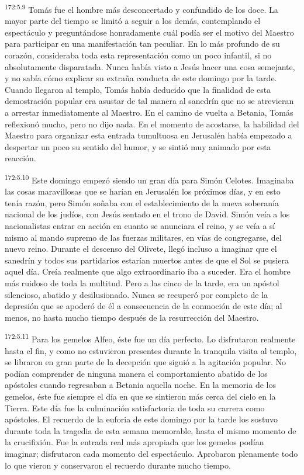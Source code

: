 \par
\textsuperscript{172:5.9} Tomás fue el hombre más desconcertado y confundido de los doce. La mayor parte del tiempo se limitó a seguir a los demás, contemplando el espectáculo y preguntándose honradamente cuál podía ser el motivo del Maestro para participar en una manifestación tan peculiar. En lo más profundo de su corazón, consideraba toda esta representación como un poco infantil, si no absolutamente disparatada. Nunca había visto a Jesús hacer una cosa semejante, y no sabía cómo explicar su extraña conducta de este domingo por la tarde. Cuando llegaron al templo, Tomás había deducido que la finalidad de esta demostración popular era asustar de tal manera al sanedrín que no se atrevieran a arrestar inmediatamente al Maestro. En el camino de vuelta a Betania, Tomás reflexionó mucho, pero no dijo nada. En el momento de acostarse, la habilidad del Maestro para organizar esta entrada tumultuosa en Jerusalén había empezado a despertar un poco su sentido del humor, y se sintió muy animado por esta reacción.

\par
\textsuperscript{172:5.10} Este domingo empezó siendo un gran día para Simón Celotes. Imaginaba las cosas maravillosas que se harían en Jerusalén los próximos días, y en esto tenía razón, pero Simón soñaba con el establecimiento de la nueva soberanía nacional de los judíos, con Jesús sentado en el trono de David. Simón veía a los nacionalistas entrar en acción en cuanto se anunciara el reino, y se veía a sí mismo al mando supremo de las fuerzas militares, en vías de congregarse, del nuevo reino. Durante el descenso del Olivete, llegó incluso a imaginar que el sanedrín y todos sus partidarios estarían muertos antes de que el Sol se pusiera aquel día. Creía realmente que algo extraordinario iba a suceder. Era el hombre más ruidoso de toda la multitud. Pero a las cinco de la tarde, era un apóstol silencioso, abatido y desilusionado. Nunca se recuperó por completo de la depresión que se apoderó de él a consecuencia de la conmoción de este día; al menos, no hasta mucho tiempo después de la resurrección del Maestro.

\par
\textsuperscript{172:5.11} Para los gemelos Alfeo, éste fue un día perfecto. Lo disfrutaron realmente hasta el fin, y como no estuvieron presentes durante la tranquila visita al templo, se libraron en gran parte de la decepción que siguió a la agitación popular. No podían comprender de ninguna manera el comportamiento abatido de los apóstoles cuando regresaban a Betania aquella noche. En la memoria de los gemelos, éste fue siempre el día en que se sintieron más cerca del cielo en la Tierra. Este día fue la culminación satisfactoria de toda su carrera como apóstoles. El recuerdo de la euforia de este domingo por la tarde los sostuvo durante toda la tragedia de esta semana memorable, hasta el mismo momento de la crucifixión. Fue la entrada real más apropiada que los gemelos podían imaginar; disfrutaron cada momento del espectáculo. Aprobaron plenamente todo lo que vieron y conservaron el recuerdo durante mucho tiempo.

